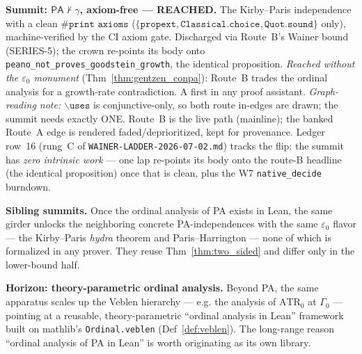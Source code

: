 \begin{theorem}\label{thm:pa_not_proves_goodstein}
  \leanok
\textbf{Summit: \(\mathsf{PA}\nvdash\gamma\), axiom-free --- REACHED.}  The Kirby--Paris independence
with a clean \(\texttt{\#print axioms}\) (\(\{\texttt{propext},\texttt{Classical.choice},
\texttt{Quot.sound}\}\) only), machine-verified by the CI axiom gate.  Discharged via Route~B's Wainer
bound (SERIES-5); the crown re-points its body onto \texttt{peano\_not\_proves\_goodstein\_growth}, the
identical proposition.  \emph{Reached without the \(\varepsilon_0\) monument}
(Thm~\ref{thm:gentzen_conpa}): Route~B trades the ordinal analysis for a growth-rate contradiction.
A first in any proof assistant.  \emph{Graph-reading note:} \(\backslash\texttt{uses}\) is conjunctive-only, so both
route in-edges are drawn; the summit needs exactly ONE.  Route~B is the live path (mainline); the
banked Route~A edge is rendered faded/deprioritized, kept for provenance.
Ledger row~16 (rung~C of \texttt{WAINER-LADDER-2026-07-02.md}) tracks the flip: the summit has
\emph{zero intrinsic work} --- one lap re-points its body onto the route-B headline (the identical
proposition) once that is clean, plus the W7 \texttt{native\_decide} burndown.
\end{theorem}

\begin{theorem}\label{thm:siblings}
  \notready
\textbf{Sibling summits.}  Once the ordinal analysis of PA exists in Lean, the same girder unlocks the
neighboring concrete PA-independences with the same \(\varepsilon_0\) flavor --- the Kirby--Paris
\emph{hydra} theorem and Paris--Harrington --- none of which is formalized in any prover.  They reuse
Thm~\ref{thm:two_sided} and differ only in the lower-bound half.
\end{theorem}

\begin{theorem}\label{thm:horizon}
  \notready
\textbf{Horizon: theory-parametric ordinal analysis.}  Beyond PA, the same apparatus scales up the
Veblen hierarchy --- e.g. the analysis of \(\mathrm{ATR}_0\) at \(\Gamma_0\) --- pointing at a reusable,
theory-parametric ``ordinal analysis in Lean'' framework built on mathlib's \texttt{Ordinal.veblen}
(Def~\ref{def:veblen}).  The long-range reason ``ordinal analysis of PA in Lean'' is worth originating
as its own library.
\end{theorem}
